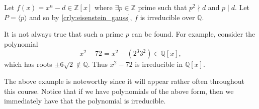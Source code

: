 \documentclass[notoc,notitlepage,nobib]{tufte-book}
\begin{document}
\begin{eg}
  Let $f(x) = x^n - d \in \mathbb{Z}[x]$ where $\exists p \in \mathbb{Z}$ prime such that
  $p^2 \nmid d$ and $p \mid d$. Let $P = \langle p \rangle$ and so by \cref{crly:eisenstein_gauss},
  $f$ is irreducible over $\mathbb{Q}$.
\end{eg}

\begin{eg}
  It is not always true that such a prime $p$ can be found. For example,
  consider the polynomial
  \begin{equation*}
    x^2 - 72 = x^2 - \left( 2^3 3^2 \right) \in \mathbb{Q}[x],
  \end{equation*}
  which has roots $\pm 6 \sqrt{2} \notin \mathbb{Q}$. Thus $x^2 - 72$ is
  irreducible in $\mathbb{Q}[x]$.
\end{eg}

\begin{note}
  The above example is noteworthy since it will appear rather often throughout this course. Notice
  that if we have polynomials of the above form, then we immediately have that the polynomial is
  irreducible.
\end{note}
\end{document}
